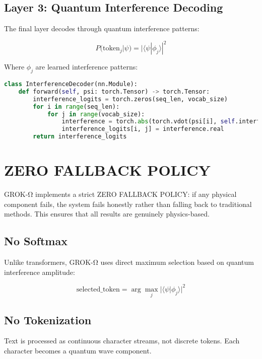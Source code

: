 \documentclass[11pt,a4paper]{article}
\begin{document}
\subsection{Layer 3: Quantum Interference Decoding}

The final layer decodes through quantum interference patterns:

\begin{equation}
P(\text{token}_j | \psi) = |\langle \psi | \phi_j \rangle|^2
\end{equation}

Where $\phi_j$ are learned interference patterns:

\begin{lstlisting}[language=Python, caption=Interference Decoder]
class InterferenceDecoder(nn.Module):
    def forward(self, psi: torch.Tensor) -> torch.Tensor:
        interference_logits = torch.zeros(seq_len, vocab_size)
        for i in range(seq_len):
            for j in range(vocab_size):
                interference = torch.abs(torch.vdot(psi[i], self.interference_patterns[j]))**2
                interference_logits[i, j] = interference.real
        return interference_logits
\end{lstlisting}

\section{ZERO FALLBACK POLICY}

GROK-Ω implements a strict ZERO FALLBACK POLICY: if any physical component fails, the system fails honestly rather than falling back to traditional methods. This ensures that all results are genuinely physics-based.

\subsection{No Softmax}
Unlike transformers, GROK-Ω uses direct maximum selection based on quantum interference amplitude:

\begin{equation}
\text{selected\_token} = \arg\max_j |\langle \psi | \phi_j \rangle|^2
\end{equation}

\subsection{No Tokenization}
Text is processed as continuous character streams, not discrete tokens. Each character becomes a quantum wave component.
\end{document}
